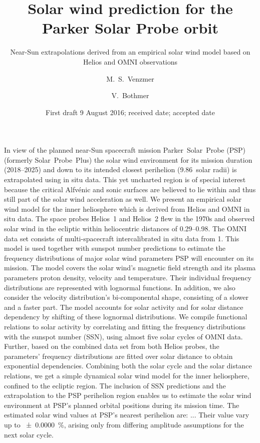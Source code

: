 
\title{Solar wind prediction for the Parker Solar Probe orbit}
\subtitle{Near-Sun extrapolations derived from an empirical solar wind model based on Helios and OMNI observations}

\author{M.~S.~Venzmer
\and V.~Bothmer}


\date{First draft 9 August 2016; received date; accepted date }

\abstract
{In view of the planned near-Sun spacecraft mission Parker~Solar~Probe (PSP) (formerly Solar~Probe~Plus) the solar wind environment for its mission duration (2018--2025) and down to its intended closest perihelion (\num{9.86}~solar radii) is extrapolated using in situ data. This yet uncharted region is of special interest because the critical Alfvénic and sonic surfaces are believed to lie within and thus still part of the solar wind acceleration as well.}	%
{We present an empirical solar wind model for the inner heliosphere which is derived from Helios and OMNI in situ data. The space probes Helios~1 and Helios~2 flew in the 1970s and observed solar wind in the ecliptic within heliocentric distances of \SIrange{0.29}{0.98}{\au}. The OMNI data set consists of multi-spacecraft intercalibrated in situ data from \SI{1}{\au}. This model is used together with sunspot number predictions to estimate the frequency distributions of major solar wind parameters PSP will encounter on its mission.}	%
{The model covers the solar wind's magnetic field strength and its plasma parameters proton density, velocity and temperature.
Their individual frequency distributions are represented with lognormal functions. In addition, we also consider the velocity distribution's bi-componental shape, consisting of a slower and a faster part. The model accounts for solar activity and for solar distance dependency by shifting of these lognormal distributions. We compile functional relations to solar activity by correlating and fitting the frequency distributions with the sunspot number (SSN), using almost five solar cycles of OMNI data. Further, based on the combined data set from both Helios probes, the parameters' frequency distributions are fitted over solar distance to obtain exponential dependencies. Combining both the solar cycle and the solar distance relations, we get a simple dynamical solar wind model for the inner heliosphere, confined to the ecliptic region.}	%
{The inclusion of SSN predictions and the extrapolation to the PSP perihelion region enables us to estimate the solar wind environment at PSP's planned orbital positions during its mission time. The estimated solar wind values at PSP's nearest perihelion are: ... Their value vary up to \SI{+-0.0000}{\percent}, arising only from differing amplitude assumptions for the next solar cycle.}	%
{}	%

